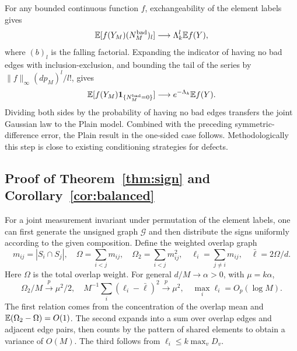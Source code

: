 For any bounded continuous function $f$, exchangeability of the element labels gives
\begin{equation*}
\mathbb E[f(Y_M)(N^{\rm bad}_M)_l]\longrightarrow
\Lambda_k^l\mathbb E f(Y),
\end{equation*}
where $(b)_l$ is the falling factorial. Expanding the indicator of having no bad edges with
inclusion-exclusion, and bounding the tail of the series by $\|f\|_\infty(dp_M)^l/l!$, gives
\begin{equation*}
\mathbb E[f(Y_M)\mathbf1_{\{N^{\rm bad}_M=0\}}]
\longrightarrow e^{-\Lambda_k}\mathbb E f(Y).
\end{equation*}
Dividing both sides by the probability of having no bad edges transfers the joint Gaussian law to the Plain
model. Combined with the preceding symmetric-difference error, the Plain result in the one-sided case
follows. Methodologically this step is close to existing conditioning strategies for defects\cite{jl}.

\subsection{Proof of Theorem~\ref{thm:sign} and Corollary~\ref{cor:balanced}}\label{sec:signproof}
For a joint measurement invariant under permutation of the element labels, one can first generate the
unsigned graph $\mathcal G$ and then distribute the signs uniformly according to the given composition.
Define the weighted overlap graph
\begin{equation*}
m_{ij}=|S_i\cap S_j|,\quad
\Omega=\sum_{i<j}m_{ij},\quad \Omega_2=\sum_{i<j}m_{ij}^2,\quad
\ell_i=\sum_{j\ne i}m_{ij},\quad\bar\ell=2\Omega/d.
\end{equation*}
Here $\Omega$ is the total overlap weight. For general $d/M\to\alpha>0$, with $\mu=k\alpha$,
\begin{equation}
\Omega_2/M\xrightarrow p\mu^2/2,\quad
M^{-1}\sum_i(\ell_i-\bar\ell)^2\xrightarrow p\mu^2,\quad
\max_i \ell_i=O_p(\log M).\label{eq:selfavg}
\end{equation}
The first relation comes from the concentration of the overlap mean and $\mathbb E(\Omega_2-\Omega)=O(1)$. The
second expands into a sum over overlap edges and adjacent edge pairs, then counts by the pattern of shared
elements to obtain a variance of $O(M)$. The third follows from $\ell_i\le k\max_vD_v$.

